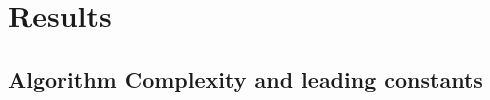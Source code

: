 \documentclass[10pt,journal,cspaper,compsoc]{IEEEtran}
\begin{document}




% 



\section{Results} %
\label{sec:theoretical_results}





\subsection{Algorithm Complexity and leading constants} %
\label{sub:algorithm_complexity_and_leading_constants}
\end{document}
